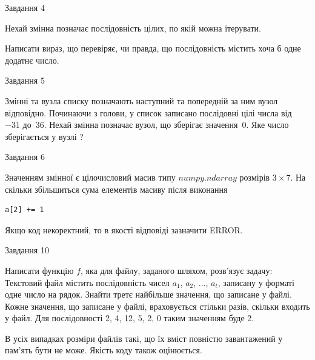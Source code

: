 \documentclass[12pt, ukrainian]{article}
\begin{document}
{               
{\begin{center}Завдання {4}\end{center}}
\vspace{-6mm}
Нехай змінна  позначає послідовність цілих, по якій можна ітерувати.

Написати вираз, що перевіряє, чи правда, що послідовність  містить хоча б одне додатнє число.\par

\vspace{10mm}
               
{\begin{center}Завдання {5}\end{center}}
\vspace{-6mm}
Змінні  та  вузла списку позначають наступний та попередній за ним вузол відповідно. Починаючи з голови, у список записано послідовні цілі числа від~$-31$ до~$36$. Нехай змінна  позначає вузол, що зберігає значення~$0$.
Яке число зберігається у вузлі  ?\par

               
{\begin{center}Завдання {6}\end{center}}
\vspace{-6mm}
Значенням змінної  є цілочисловий масив типу $numpy.ndarray$ розмірів $3{\times}7$. На скільки збільшиться сума елементів масиву  після виконання
\begin{verbatim}
a[2] += 1
\end{verbatim}


Якщо код некоректний, то в якості відповіді зазначити ERROR.\par

               
{\begin{center}Завдання {10}\end{center}}
\vspace{-6mm}

Написати функцію $f$, яка для файлу, заданого шляхом, розв’язує задачу:\\ Текстовий файл містить послідовність чисел $a_1$, $a_2$, $\ldots$, $a_t$, записану у форматі одне число на рядок. Знайти третє найбільше значення, що записане у файлі. Кожне значення, що записане у файлі, враховується стільки разів, скільки входить у файл. Для послідовності 2, 4, 12, 5, 2, 0 таким значенням буде 2.

В усіх випадках розміри файлів такі, що їх вміст повністю завантажений у пам'ять бути не може. Якість коду також оцінюється.



}
\end{document}

